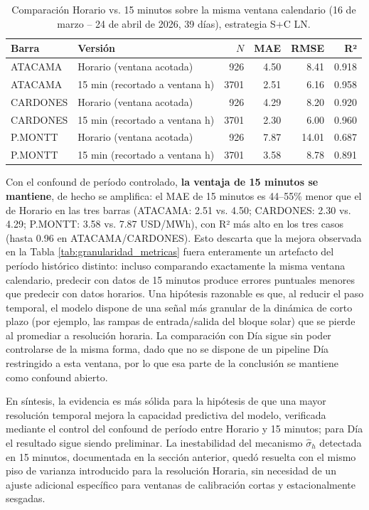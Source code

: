 \begin{table}[htbp]
    \centering
    \begin{tabular}{llrrrr}
        \toprule
        Barra & Versión & $N$ & MAE & RMSE & R² \\
        \midrule
        ATACAMA  & Horario (ventana acotada)        & 926  & 4.50 & 8.41  & 0.918 \\
        ATACAMA  & 15 min (recortado a ventana h)    & 3701 & 2.51 & 6.16  & 0.958 \\
        CARDONES & Horario (ventana acotada)        & 926  & 4.29 & 8.20  & 0.920 \\
        CARDONES & 15 min (recortado a ventana h)    & 3701 & 2.30 & 6.00  & 0.960 \\
        P.MONTT  & Horario (ventana acotada)        & 926  & 7.87 & 14.01 & 0.687 \\
        P.MONTT  & 15 min (recortado a ventana h)    & 3701 & 3.58 & 8.78  & 0.891 \\
        \bottomrule
    \end{tabular}
    \caption{Comparación Horario vs. 15 minutos sobre la misma ventana calendario (16 de marzo -- 24 de abril de 2026, 39 días), estrategia S+C LN.}
    \label{tab:h_vs_15min}
\end{table}

Con el confound de período controlado, \textbf{la ventaja de 15 minutos se mantiene}, de hecho se amplifica: el MAE de 15 minutos es 44--55\% menor que el de Horario en las tres barras (ATACAMA: 2.51 vs. 4.50; CARDONES: 2.30 vs. 4.29; P.MONTT: 3.58 vs. 7.87 USD/MWh), con R² más alto en los tres casos (hasta 0.96 en ATACAMA/CARDONES). Esto descarta que la mejora observada en la Tabla \ref{tab:granularidad_metricas} fuera enteramente un artefacto del período histórico distinto: incluso comparando exactamente la misma ventana calendario, predecir con datos de 15 minutos produce errores puntuales menores que predecir con datos horarios. Una hipótesis razonable es que, al reducir el paso temporal, el modelo dispone de una señal más granular de la dinámica de corto plazo (por ejemplo, las rampas de entrada/salida del bloque solar) que se pierde al promediar a resolución horaria. La comparación con Día sigue sin poder controlarse de la misma forma, dado que no se dispone de un pipeline Día restringido a esta ventana, por lo que esa parte de la conclusión se mantiene como confound abierto.

En síntesis, la evidencia es más sólida para la hipótesis de que una mayor resolución temporal mejora la capacidad predictiva del modelo, verificada mediante el control del confound de período entre Horario y 15 minutos; para Día el resultado sigue siendo preliminar. La inestabilidad del mecanismo $\hat\sigma_h$ detectada en 15 minutos, documentada en la sección anterior, quedó resuelta con el mismo piso de varianza introducido para la resolución Horaria, sin necesidad de un ajuste adicional específico para ventanas de calibración cortas y estacionalmente sesgadas.
